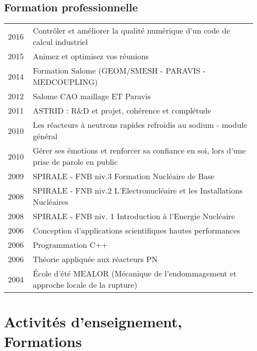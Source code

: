 \documentclass[11pt,a4paper]{moderncv}
\let\origsubsection\subsection%
\let\subsection\section%
\let\subsection\origsubsection%
\begin{document}



\subsection{Formation professionnelle}
	
\begin{tabular}[htbp]{p{0.1\linewidth}p{0.9\linewidth}}
  2016 & Contrôler et améliorer la qualité numérique d'un code de calcul industriel \\
  2015 & Animez et optimisez vos réunions\\
  2014 & Formation Salome (GEOM/SMESH - PARAVIS - MEDCOUPLING) \\
  2012 & Salome CAO maillage ET Paravis \\
  2011 & ASTRID : R\&D et projet, cohérence et complétude \\
  2010 & Les réacteurs à neutrons rapides refroidis au sodium - module général \\
  2010 & Gérer ses émotions et renforcer sa confiance en soi, lors d'une prise de parole en public \\
  2009 & SPIRALE - FNB niv.3 Formation Nucléaire de Base \\
  2008 & SPIRALE - FNB niv.2 L'Electronucléaire et les Installations Nucléaires  \\
  2008 & SPIRALE - FNB niv. 1 Introduction à l'Energie Nucléaire \\
  2006 & Conception d'applications scientifiques hautes performances \\
  2006 & Programmation C++ \\
  2006 & Théorie appliquée aux réacteurs PN \\
  2004 & École d'été MEALOR (Mécanique de l'endommagement et approche locale de la rupture)\\
\end{tabular}

\section{Activités d'enseignement, Formations}
\end{document}
